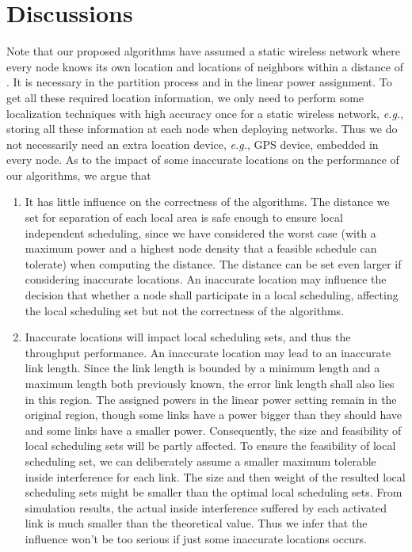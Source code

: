 \documentclass[journal]{IEEEtran}
\begin{document}
\section{Discussions}

Note that our proposed algorithms have assumed a  static wireless network where every node knows its own location and locations of neighbors within a distance of . It is necessary in the partition process and in the linear power assignment. To get all these required location information, we only need to perform some localization techniques with high accuracy once for a static wireless network, \emph{e.g.}, storing all these information at each node when deploying  networks. Thus we do not necessarily need an extra location device, \emph{e.g.}, GPS device, embedded in every node. As to the impact of some inaccurate locations on the performance of our algorithms, we argue that
\begin{enumerate}
  \item It has little influence on the correctness of the algorithms. The distance we set for separation of each local area is safe enough to ensure local independent scheduling, since we have considered the worst case (with a maximum power and a highest node density that a feasible schedule can tolerate) when computing the distance. The distance can be set even larger if considering inaccurate locations.  An inaccurate location may influence the decision that whether a node shall participate in a local scheduling, affecting the local scheduling set but not the correctness of the algorithms.
  \item Inaccurate locations will impact local scheduling sets, and thus the throughput performance. An inaccurate location may lead to an inaccurate link length. Since the link length is bounded by  a minimum length and a maximum length both previously known, the error link length shall also lies in this region. The assigned powers in the linear power setting remain in the original region, though some links have a power bigger than they should have and some links have a smaller power.
     Consequently, the size and feasibility of local scheduling sets will be partly affected. To ensure the feasibility of local scheduling set, we can deliberately assume a smaller maximum tolerable inside interference  for each link.  The size and then weight of the resulted local scheduling sets might be smaller than the optimal local scheduling sets. From simulation results, the actual inside interference suffered by each activated link is much smaller than the theoretical value. Thus we infer that the influence won't be too serious if just some inaccurate locations occurs.
\end{enumerate}
\end{document}
